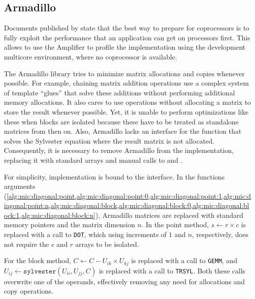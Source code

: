 \documentclass[../thesis]{subfiles}
\begin{document}
		\subsection{Armadillo}
		Documents published by \intel\cite{Intel:MIC:Overview} state that the best way to prepare for \intel\xeonphi coprocessors is to fully exploit the performance that an application can get on \intel\xeon processors first. This allows to use the \intel\vtune Amplifier to profile the implementation using the development multicore environment, where no coprocessor is available.


		The Armadillo library tries to minimize matrix allocations and copies whenever possible. For example, chaining matrix addition operations use a complex system of template ``glues'' that solve these additions without performing additional memory allocations. It also cares to use \blas operations without allocating a matrix to store the result whenever possible. Yet, it is unable to perform optimizations like these when blocks are isolated because these have to be treated as standalone matrices from then on. Also, Armadillo lacks an interface for the \lapack function that solves the Sylvester equation where the result matrix is not allocated. Consequently, it is necessary to remove Armadillo from the implementation, replacing it with standard arrays and manual calls to \blas and \lapack.

		For simplicity, implementation is bound to the \intel\mkl\blas interface. In the functions arguments (\cref{alg:mic:diagonal:point,alg:mic:diagonal:point:0,alg:mic:diagonal:point:1,alg:mic:diagonal:point:n,alg:mic:diagonal:block,alg:mic:diagonal:block:0,alg:mic:diagonal:block:1,alg:mic:diagonal:block:n}), Armadillo matrices are replaced with standard memory pointers and the matrix dimension $n$. In the point method, $s \leftarrow r \times c$ is replaced with a call to \blas\texttt{DOT}, which using increments of $1$ and $n$, respectively, does not require the $c$ and $r$ arrays to be isolated.

		For the block method, $C \leftarrow C - U_{ik} \times U_{kj}$ is replaced with a call to \blas\texttt{GEMM}, and $U_{ij} \leftarrow \mathtt{sylvester} \left( U_{ii}, U_{jj}, C\right)$ is replaced with a call to \lapack\texttt{TRSYL}. Both these calls overwrite one of the operands, effectively removing any need for allocations and copy operations.
\end{document}
